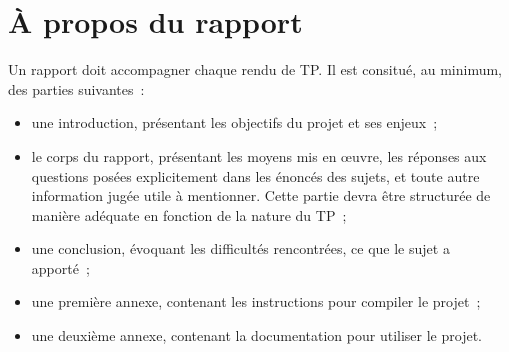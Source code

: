\documentclass[12pt]{article}
\theoremstyle{definition}
\begin{document}
\section{À propos du rapport}
Un rapport doit accompagner chaque rendu de TP. Il est consitué, au 
minimum, des parties suivantes~:
\begin{itemize}
    \item une introduction, présentant les objectifs du projet et ses 
    enjeux~;
    \smallskip
    
    \item le corps du rapport, présentant les moyens mis en \oe uvre,
    les réponses aux questions posées explicitement dans les énoncés des 
    sujets, et toute autre information jugée utile à mentionner. Cette
    partie devra être structurée de manière adéquate en fonction de la
    nature du TP~;
    \smallskip
    
    \item une conclusion, évoquant les difficultés rencontrées, ce que 
    le sujet a apporté~;
    \smallskip
    
    \item une première annexe, contenant les instructions pour compiler
    le projet~;
    \smallskip
    
    \item une deuxième annexe, contenant la documentation pour utiliser 
    le projet.
\end{itemize}
\medskip

\end{document}
